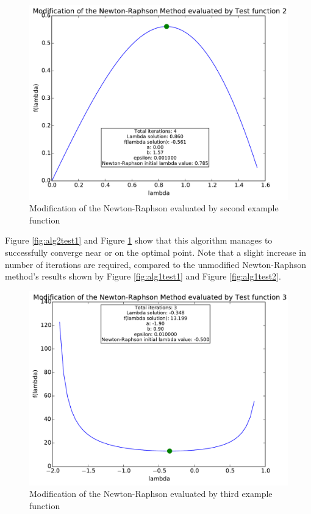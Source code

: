 \documentclass[a4paper,10pt]{article}
\begin{document}
\begin{figure}[h]
\centering
 \includegraphics[scale=0.55]{./graphs/algorithm2/x_in_middel/testFunction2.pdf} 
 \caption{Modification of the Newton-Raphson evaluated by second example function}
 \label{fig:alg2test2}
\end{figure}

Figure \ref{fig:alg2test1} and Figure \ref{fig:alg2test2} show that this algorithm manages to successfully converge near or on the optimal point. Note that a slight increase in number of iterations are required, compared to the unmodified Newton-Raphson method's results shown by Figure \ref{fig:alg1test1} and Figure \ref{fig:alg1test2}.

\newpage
\begin{figure}[h]
\centering
 \includegraphics[scale=0.55]{./graphs/algorithm2/x_in_middel/testFunction3.pdf} 
 \caption{Modification of the Newton-Raphson evaluated by third example function}
 \label{fig:alg2test3}
\end{figure}
\end{document}
